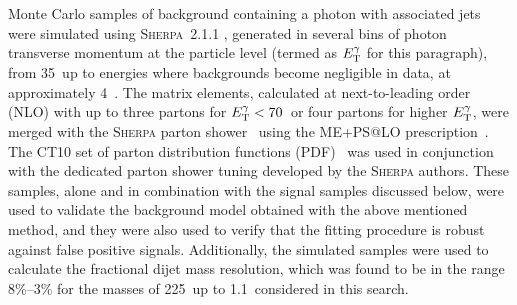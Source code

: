 Monte Carlo samples of background containing a photon with associated jets were simulated using \textsc{Sherpa}~2.1.1 \cite{Gleisberg:2008ta}, generated in several bins of photon transverse momentum at the particle level (termed as $E_{\textrm{T}}^{\gamma}$ for this paragraph), from 35~\GeV up to energies where backgrounds become negligible in data, at approximately 4~\TeV.
The matrix elements, calculated at next-to-leading order (NLO) with up to three partons for  $E_{\textrm{T}}^{\gamma}<70$~\GeV or four partons for higher $E_{\textrm{T}}^{\gamma}$,
were merged with the \textsc{Sherpa} parton shower~\cite{Schumann:2007mg} using the \textsc{ME+PS@LO} prescription~\cite{Hoeche:2009rj}.
The \textsc{CT10} set of parton distribution functions (PDF)~\cite{Lai:2010vv} was used in conjunction with the dedicated parton shower tuning developed by the \textsc{Sherpa} authors.
These samples, alone and in combination with the signal samples discussed below, were used to validate the background model obtained with the above mentioned method, and they were also used to verify that the fitting procedure is robust against false positive signals. Additionally, the simulated samples were used to calculate the fractional dijet mass resolution, which was found to be in the range 8\%--3\% for the masses of 225~\GeV up to 1.1~\TeV considered in this search.



